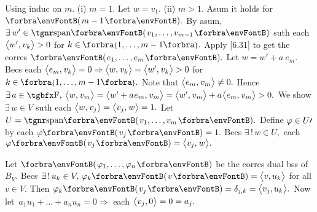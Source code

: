Using induc on $m.$ (i) $m=1.$ Let $w=v_1.$ (ii) $m>1.$ Asum it holds for $\Par{m-1}.$\parSol{}
By asum, $\exists\,w'\in\Span{v_1,\dots,v_{m-1}}$ suth each $\big\langle{}w',\:\!v_k{}\big\rangle>0$ for $k\in\;\!\!\Bra{1,\dots,m-1}.$\parSol{}
Apply [6.31] to get the corres $\Par{e_1,\dots,e_m}.$ \;Let $w=w'+a\:\!e_m.$\parSol{}
Becs each $\big\langle{}e_m,\:\!v_k{}\big\rangle=0\Rightarrow\big\langle{}w,\:\!v_k{}\big\rangle=\big\langle{}w',\:\!v_k{}\big\rangle>0$ for $k\in\;\!\!\Bra{1,\dots,m-1}.$\parSol{}
Note that $\big\langle{}e_m,\:\!v_m{}\big\rangle\neq0.$ Hence $\exists\,a\in\Fbb,\:\Ang{w,\:\!v_m}=\Ang{w'+a\:\!e_m,\:\!v_m}=\Ang{w',\:\!v_m}+a\:\!\Ang{e_m,\:\!v_m}>0.$\PfEnd\vspace{4pt}\parSol{}
\Or We show $\exists\,w\in V$ suth each $\big\langle{}w,\:\!v_j{}\big\rangle=\big\langle{}v_j,\:\!w{}\big\rangle=1.$ Let $U=\Span{v_1,\dots,v_m}.$\parSol{}
Define $\varphi\in U\prime$ by each $\varphi\Par{v_j}=1.$ \;Becs $\exists\,!\,w\in U,$ each $\varphi\Par{v_j}=\Ang{v_j,\:\!w}.$\PfEnd
\SepLine

Let $\Par{\varphi_1,\dots,\varphi_n}$ be the corres dual bss of $B_V.$ \;Becs $\exists\,!\,u_k\in V,\,\varphi_k\Par{v}=\Ang{v,u_k}$ for all $v\in V.$\parSol{}
Then $\varphi_k\Par{v_j}=\delta_{j,k}=\Ang{v_j,u_k}.$ \;Now let \,$a_1u_1+\dots+a_nu_n=0\Rightarrow$ each $\big\langle{}v_j,0{}\big\rangle=0=a_j.$\PfEnd
\SepLine

